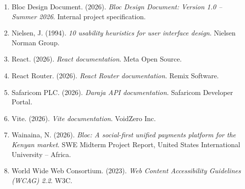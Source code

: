 \documentclass[12pt,a4paper]{article}
\begin{document}
\begin{enumerate}
    \item Bloc Design Document. (2026). \textit{Bloc Design Document: Version 1.0 -- Summer 2026}. Internal project specification.
    \item Nielsen, J. (1994). \textit{10 usability heuristics for user interface design}. Nielsen Norman Group.
    \item React. (2026). \textit{React documentation}. Meta Open Source.
    \item React Router. (2026). \textit{React Router documentation}. Remix Software.
    \item Safaricom PLC. (2026). \textit{Daraja API documentation}. Safaricom Developer Portal.
    \item Vite. (2026). \textit{Vite documentation}. VoidZero Inc.
    \item Wainaina, N. (2026). \textit{Bloc: A social-first unified payments platform for the Kenyan market}. SWE Midterm Project Report, United States International University -- Africa.
    \item World Wide Web Consortium. (2023). \textit{Web Content Accessibility Guidelines (WCAG) 2.2}. W3C.
\end{enumerate}
\end{document}

